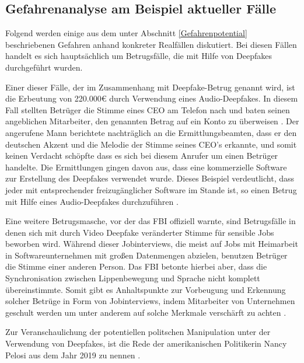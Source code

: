 \subsection{Gefahrenanalyse am Beispiel aktueller Fälle}\label{GefahrenAktuelleFaelle}
Folgend werden einige aus dem unter Abschnitt \ref{Gefahrenpotential} beschriebenen Gefahren anhand konkreter Realfällen diskutiert. 
Bei diesen Fällen handelt es sich hauptsächlich um Betrugsfälle, die mit Hilfe von Deepfakes durchgeführt wurden.
\par
Einer dieser Fälle, der im Zusammenhang mit Deepfake-Betrug genannt wird, ist die Erbeutung von 220.000\euro{} durch Verwendung eines Audio-Deepfakes.
In diesem Fall stellten Betrüger die Stimme eines CEO am Telefon nach und baten seinen angeblichen Mitarbeiter, den genannten Betrag auf ein Konto zu überweisen \citep[][]{Stupp2019}. 
Der angerufene Mann berichtete nachträglich an die Ermittlungsbeamten, dass er den deutschen Akzent und die Melodie der Stimme seines CEO's erkannte, und somit keinen Verdacht schöpfte dass es sich bei diesem Anrufer um einen Betrüger handelte.
Die Ermittlungen gingen davon aus, dass eine kommerzielle Software zur Erstellung des Deepfakes verwendet wurde.
Dieses Beispiel verdeutlicht, dass jeder mit entsprechender freizugänglicher Software im Stande ist, so einen Betrug mit Hilfe eines Audio-Deepfakes durchzuführen \citep[Vgl.][]{Stupp2019}. 
\par
Eine weitere Betrugsmasche, vor der das FBI offiziell warnte, sind Betrugsfälle in denen sich mit durch Video Deepfake veränderter Stimme für sensible Jobs beworben wird.
Während dieser Jobinterviews, die meist auf Jobs mit Heimarbeit in Softwareunternehmen mit großen Datenmengen abzielen, benutzen Betrüger die Stimme einer anderen Person.
Das FBI betonte hierbei aber, dass die Synchronisation zwischen Lippenbewegung und Sprache nicht komplett übereinstimmte.
Somit gibt es Anhaltspunkte zur Vorbeugung und Erkennung solcher Betrüge in Form von Jobinterviews, indem Mitarbeiter von Unternehmen geschult werden um unter anderem auf solche Merkmale verschärft zu achten \citep[][]{Ferraro2022}. 
\par
Zur Veranschaulichung der potentiellen politschen Manipulation unter der Verwendung von Deepfakes, ist die Rede der amerikanischen Politikerin Nancy Pelosi aus dem Jahr 2019 zu nennen \citep[Vgl.][]{Mervosh2019}.
